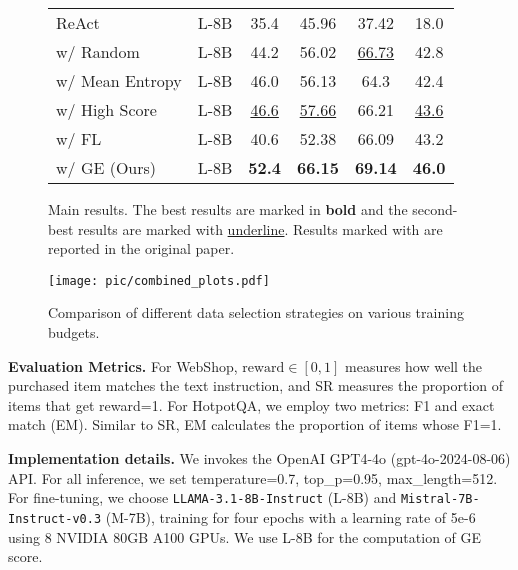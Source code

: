 \begin{figure*}[ht]
\begin{minipage}{0.56\textwidth}
\begin{tabular}{@{}lccccc@{}}
            ReAct       & L-8B & 35.4     & 45.96     & 37.42    & 18.0     \\
            \quad w/ Random   & L-8B & 44.2& 56.02     & \underline{66.73}    & 42.8     \\
            \quad w/ Mean Entropy& L-8B & 46.0& 56.13     & 64.3     & 42.4     \\
            \quad w/ High Score  & L-8B & \underline{46.6}& \underline{57.66}     & 66.21    & \underline{43.6}     \\
            \quad w/ FL  & L-8B & 40.6& 52.38     & 66.09    & 43.2     \\
            \midrule
            \quad w/ GE (Ours)   & L-8B & \textbf{52.4}     & \textbf{66.15}    & \textbf{69.14}   & \textbf{46.0}    \\
            
            \bottomrule
        \end{tabular}
        \caption{Main results. The best results are marked in \textbf{bold} and the second-best results are marked with \underline{underline}. Results marked with \textsuperscript{\dag} are reported in the original paper.}
        \label{tab:maintab}
    
    \end{minipage}%
    \hspace{0.5cm} %
    \begin{minipage}{0.38\textwidth}
        \centering
        \texttt{[image: pic/combined\_plots.pdf]}
        \caption{Comparison of different data selection strategies on various training budgets.}
        \label{fig:Lines}
    \end{minipage}
\end{figure*}
 
\textbf{Evaluation Metrics.}
For WebShop, $\text{reward} \in [0,1]$ measures how well the purchased item matches the text instruction, and SR measures the proportion of items that get reward=1. For HotpotQA, we employ two metrics: F1 and exact match (EM). Similar to SR, EM calculates the proportion of items whose F1=1. 

\textbf{Implementation details.} We invokes the OpenAI GPT4-4o (gpt-4o-2024-08-06) API. For all inference, we set temperature=0.7, top\_p=0.95, max\_length=512. For fine-tuning, we choose \texttt{LLAMA-3.1-8B-Instruct} (L-8B) and \texttt{Mistral-7B-Instruct-v0.3} (M-7B), training for four epochs with a learning rate of 5e-6 using 8 NVIDIA 80GB A100 GPUs. We use L-8B for the computation of GE score.

